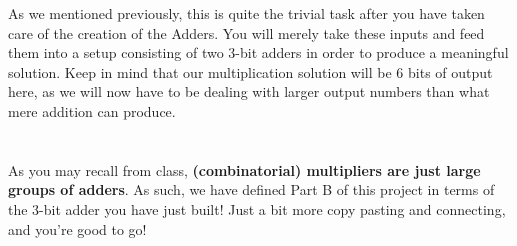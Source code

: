 \documentclass{article}
\begin{document}
As we mentioned previously, this is quite the trivial task after you have taken care of the creation of the Adders. You will merely take these inputs and feed them into a setup consisting of two 3-bit adders in order to produce a meaningful solution. Keep in mind that our multiplication solution will be 6 bits of output here, as we will now have to be dealing with larger output numbers than what mere addition can produce.

\section{\selectfont{Part B: Schematics}}

As you may recall from class, \textbf{(combinatorial) multipliers are just large groups of adders}. As such, we have defined Part B of this project in terms of the 3-bit adder you have just built! Just a bit more copy pasting and connecting, and you're good to go!



\end{document}
